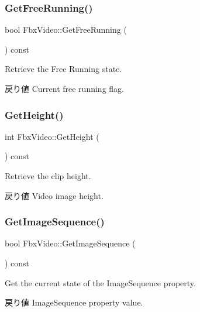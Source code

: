 \subsubsection{\texorpdfstring{Get\+Free\+Running()}{GetFreeRunning()}}
{\footnotesize\ttfamily bool Fbx\+Video\+::\+Get\+Free\+Running (\begin{DoxyParamCaption}{ }\end{DoxyParamCaption}) const}

Retrieve the Free Running state. \begin{DoxyReturn}{戻り値}
Current free running flag. 
\end{DoxyReturn}
\mbox{\label{class_fbx_video_a49e54923c0ec892e5bebf479545a32de}} 
\subsubsection{\texorpdfstring{Get\+Height()}{GetHeight()}}
{\footnotesize\ttfamily int Fbx\+Video\+::\+Get\+Height (\begin{DoxyParamCaption}{ }\end{DoxyParamCaption}) const}

Retrieve the clip height. \begin{DoxyReturn}{戻り値}
Video image height. 
\end{DoxyReturn}
\mbox{\label{class_fbx_video_aefb54b6ccb813ae4da9062b27db5fb1f}} 
\subsubsection{\texorpdfstring{Get\+Image\+Sequence()}{GetImageSequence()}}
{\footnotesize\ttfamily bool Fbx\+Video\+::\+Get\+Image\+Sequence (\begin{DoxyParamCaption}{ }\end{DoxyParamCaption}) const}

Get the current state of the Image\+Sequence property. \begin{DoxyReturn}{戻り値}
Image\+Sequence property value. 
\end{DoxyReturn}
\mbox{\label{class_fbx_video_a9b37e1a2972b4cf0016ad94d86ea5680}} 
